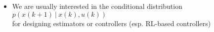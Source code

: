 \documentclass[aspectratio=169,handout]{beamer} 	%
\begin{document}
\begin{frame}
	\frametitle{}
	\begin{itemize}[<+->]
		\itemsep\baselineskip
		\item We are usually interested in the conditional distribution
		$p(x(k + 1) ~|~ x(k), u(k))$ \\
		for designing estimators or controllers (esp. RL-based controllers)
		
		
	\end{itemize}
	
\end{frame}
\end{document}
